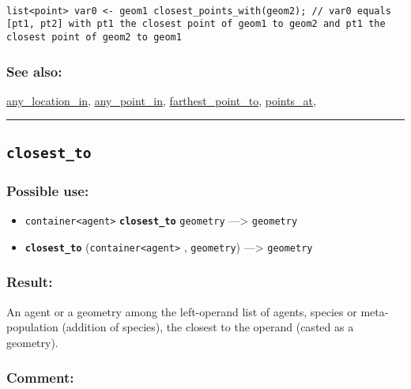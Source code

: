 \documentclass[]{book}
\providecommand{\tightlist}{%
  \setlength{\itemsep}{0pt}\setlength{\parskip}{0pt}}
\theoremstyle{definition}
\theoremstyle{definition}
\theoremstyle{definition}
\theoremstyle{remark}
\begin{document}
\begin{verbatim}
 
list<point> var0 <- geom1 closest_points_with(geom2); // var0 equals [pt1, pt2] with pt1 the closest point of geom1 to geom2 and pt1 the closest point of geom2 to geom1
\end{verbatim}

\subsubsection{See also:}\label{see-also-53}

\href{OperatorsAA\#any_location_in}{any\_location\_in},
\href{OperatorsAA\#any_point_in}{any\_point\_in},
\href{OperatorsDH\#farthest_point_to}{farthest\_point\_to},
\href{OperatorsNR\#points_at}{points\_at},

\begin{center}\rule{0.5\linewidth}{\linethickness}\end{center}

\subsection{\texorpdfstring{\texttt{closest\_to}}{closest\_to}}\label{closest_to}

\subsubsection{Possible use:}\label{possible-use-89}

\begin{itemize}
\tightlist
\item
  \texttt{container\textless{}agent\textgreater{}}
  \textbf{\texttt{closest\_to}} \texttt{geometry} ---\textgreater{}
  \texttt{geometry}
\item
  \textbf{\texttt{closest\_to}}
  (\texttt{container\textless{}agent\textgreater{}} , \texttt{geometry})
  ---\textgreater{} \texttt{geometry}
\end{itemize}

\subsubsection{Result:}\label{result-87}

An agent or a geometry among the left-operand list of agents, species or
meta-population (addition of species), the closest to the operand
(casted as a geometry).

\subsubsection{Comment:}\label{comment-20}
\end{document}
